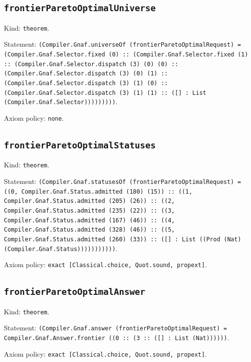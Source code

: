 \documentclass[11pt]{article}
\begin{document}
\subsection*{\texttt{frontierParetoOptimalUniverse}}
\noindent Kind: \texttt{theorem}.\par
\noindent Statement: \texttt{(Compiler.Gnaf.universeOf (frontierParetoOptimalRequest) = (Compiler.Gnaf.Selector.fixed (0) :: (Compiler.Gnaf.Selector.fixed (1) :: (Compiler.Gnaf.Selector.dispatch (3) (0) (0) :: (Compiler.Gnaf.Selector.dispatch (3) (0) (1) :: (Compiler.Gnaf.Selector.dispatch (3) (1) (0) :: (Compiler.Gnaf.Selector.dispatch (3) (1) (1) :: ([] : List (Compiler.Gnaf.Selector)))))))))}.\par
\noindent Axiom policy: \texttt{none}.\par
\subsection*{\texttt{frontierParetoOptimalStatuses}}
\noindent Kind: \texttt{theorem}.\par
\noindent Statement: \texttt{(Compiler.Gnaf.statusesOf (frontierParetoOptimalRequest) = ((0, Compiler.Gnaf.Status.admitted (180) (15)) :: ((1, Compiler.Gnaf.Status.admitted (205) (26)) :: ((2, Compiler.Gnaf.Status.admitted (235) (22)) :: ((3, Compiler.Gnaf.Status.admitted (167) (46)) :: ((4, Compiler.Gnaf.Status.admitted (328) (46)) :: ((5, Compiler.Gnaf.Status.admitted (260) (33)) :: ([] : List ((Prod (Nat) (Compiler.Gnaf.Status)))))))))))}.\par
\noindent Axiom policy: \texttt{exact [Classical.choice, Quot.sound, propext]}.\par
\subsection*{\texttt{frontierParetoOptimalAnswer}}
\noindent Kind: \texttt{theorem}.\par
\noindent Statement: \texttt{(Compiler.Gnaf.answer (frontierParetoOptimalRequest) = Compiler.Gnaf.Answer.frontier ((0 :: (3 :: ([] : List (Nat))))))}.\par
\noindent Axiom policy: \texttt{exact [Classical.choice, Quot.sound, propext]}.\par
\end{document}

